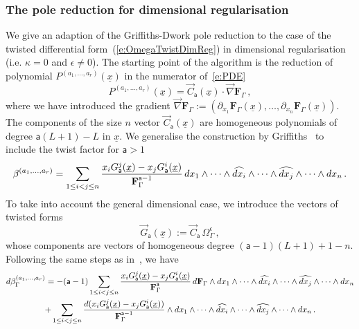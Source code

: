 \documentclass[a4paper,12pt]{article}
\numberwithin{equation}{section}
\numberwithin{figure}{section}
\begin{document}
  \subsubsection{The pole reduction for dimensional
    regularisation}\label{sec:PoleRed}
We give an adaption of the Griffiths-Dwork pole reduction to the case
of the twisted differential form~(\ref{e:OmegaTwistDimReg}) in
dimensional regularisation (i.e. $\kappa=0$ and $\epsilon\neq0$).
The starting point of the algorithm is the reduction of polynomial
$P^{(a_1,\dots,a_r)}(\underline x)$  in the numerator
of~\eqref{e:PDE}
\begin{equation}\label{e:RedF}
	P^{(a_1,\dots,a_r)}(\underline x) = \vec C_{\mathsf{a}}(\underline x)\cdot
	\vec\nabla   \textbf{F}_\Gamma \, ,
      \end{equation}
      where we have introduced the gradient $	\vec\nabla   \textbf{F}_\Gamma :=\left(\partial_{x_1}
      \textbf{F}_\Gamma(\underline x),\dots, \partial_{x_n}
      \textbf{F}_\Gamma(\underline x)\right)$.
%
The components of the size $n$ vector $ \vec C_{\mathsf{a}}(\underline x)$ are homogeneous polynomials of degree
$\mathsf{a}(L+1)-L$ in  $\underline x$. 
%
   We generalise the construction by
   Griffiths~\cite{Griffith1,Griffith2} to include the twist factor
   for $\mathsf{a}>1$ 
   \begin{equation}\label{e:betadef}
  \beta^{(a_1,\dots,a_r)}=  \sum_{1\leq i<j\leq n} {x_i
    G_{\mathsf{a}}^j  (\underline x)-x_j
   G_{\mathsf{a}}^i(\underline x)\over
  \textbf{F}_\Gamma^{\mathsf{a}-1}}\, 
 dx_1\wedge \cdots \wedge \widehat{dx_i}\wedge \cdots \wedge\widehat{dx_j}\wedge
  \cdots \wedge dx_n \, .
\end{equation}
To take into account the general dimensional case, we introduce 
the vectors of twisted forms
\begin{equation}
  \label{e:Gdef}
\vec  G_{\mathsf{a}}(\underline x):=   \vec C_{\mathsf{a}} \,\Omega_\Gamma^\epsilon \, ,
\end{equation}
whose components are vectors of homogeneous degree $(\mathsf{a}-1)(L+1)+1-n$. 
Following the same steps as in~\cite{Griffiths_1969}, we have
\begin{multline}
  d\beta_\Gamma^{(a_1,\dots,a_r)}=-  (\mathsf{a}-1) \sum_{1\leq i<j\leq n} {x_i
    G_{\mathsf{a}}^j  (\underline x)-x_j
   G_{\mathsf{a}}^i(\underline x)\over
   \textbf{F}_\Gamma^{\mathsf{a}}}\, d \textbf{F}_\Gamma\wedge
 dx_1\wedge \cdots \wedge \widehat{dx_i}\wedge \cdots \wedge\widehat{dx_j}\wedge
 \cdots \wedge dx_n \cr
+  \sum_{1\leq i<j\leq n} {d(x_i
    G_{\mathsf{a}}^j  (\underline x)-x_j
   G_{\mathsf{a}}^i(\underline x))\over
   \textbf{F}_\Gamma^{\mathsf{a}-1}}\wedge
 dx_1\wedge \cdots \wedge \widehat{dx_i}\wedge \cdots \wedge\widehat{dx_j}\wedge
  \cdots \wedge dx_n  \, .
\end{multline}
\end{document}
